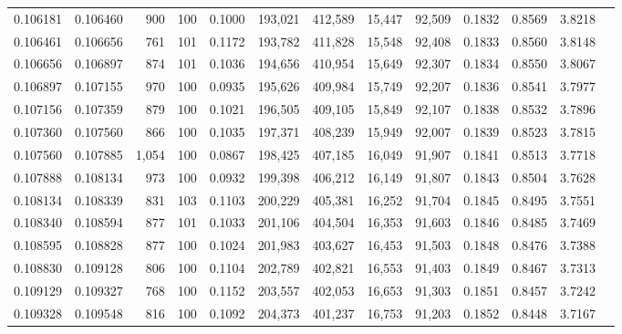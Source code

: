 \begin{tabular}{rrrrrrrrrrrrr}
0.106181 & 0.106460 &   900 & 100 &                                     0.1000 & 193,021 & 412,589 &  15,447 &  92,509 & 0.1832 & 0.8569 & 3.8218 \\
0.106461 & 0.106656 &   761 & 101 &                                     0.1172 & 193,782 & 411,828 &  15,548 &  92,408 & 0.1833 & 0.8560 & 3.8148 \\
0.106656 & 0.106897 &   874 & 101 &                                     0.1036 & 194,656 & 410,954 &  15,649 &  92,307 & 0.1834 & 0.8550 & 3.8067 \\
0.106897 & 0.107155 &   970 & 100 &                                     0.0935 & 195,626 & 409,984 &  15,749 &  92,207 & 0.1836 & 0.8541 & 3.7977 \\
0.107156 & 0.107359 &   879 & 100 &                                     0.1021 & 196,505 & 409,105 &  15,849 &  92,107 & 0.1838 & 0.8532 & 3.7896 \\
0.107360 & 0.107560 &   866 & 100 &                                     0.1035 & 197,371 & 408,239 &  15,949 &  92,007 & 0.1839 & 0.8523 & 3.7815 \\
0.107560 & 0.107885 & 1,054 & 100 &                                     0.0867 & 198,425 & 407,185 &  16,049 &  91,907 & 0.1841 & 0.8513 & 3.7718 \\
0.107888 & 0.108134 &   973 & 100 &                                     0.0932 & 199,398 & 406,212 &  16,149 &  91,807 & 0.1843 & 0.8504 & 3.7628 \\
0.108134 & 0.108339 &   831 & 103 &                                     0.1103 & 200,229 & 405,381 &  16,252 &  91,704 & 0.1845 & 0.8495 & 3.7551 \\
0.108340 & 0.108594 &   877 & 101 &                                     0.1033 & 201,106 & 404,504 &  16,353 &  91,603 & 0.1846 & 0.8485 & 3.7469 \\
0.108595 & 0.108828 &   877 & 100 &                                     0.1024 & 201,983 & 403,627 &  16,453 &  91,503 & 0.1848 & 0.8476 & 3.7388 \\
0.108830 & 0.109128 &   806 & 100 &                                     0.1104 & 202,789 & 402,821 &  16,553 &  91,403 & 0.1849 & 0.8467 & 3.7313 \\
0.109129 & 0.109327 &   768 & 100 &                                     0.1152 & 203,557 & 402,053 &  16,653 &  91,303 & 0.1851 & 0.8457 & 3.7242 \\
0.109328 & 0.109548 &   816 & 100 &                                     0.1092 & 204,373 & 401,237 &  16,753 &  91,203 & 0.1852 & 0.8448 & 3.7167 \\

\end{tabular}
